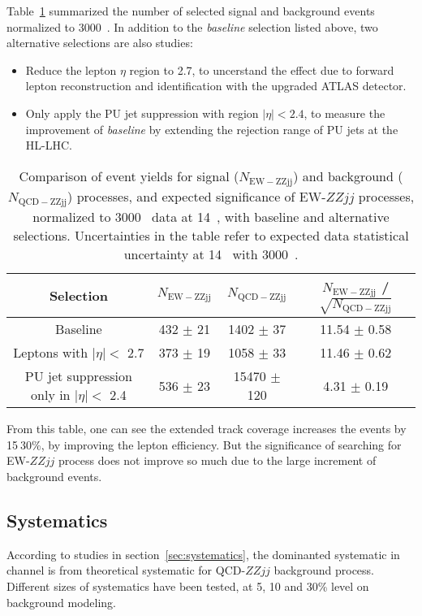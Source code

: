 Table~\ref{tab:event_yield} summarized the number of selected signal and background events normalized to 3000~\ifb.
In addition to the \textit{baseline} selection listed above, two alternative selections are also studies:
\begin{itemize}
	\item Reduce the lepton $\eta$ region to 2.7, to uncerstand the effect due to forward lepton reconstruction and identification with the upgraded ATLAS detector.
	\item Only apply the PU jet suppression with region $|\eta| < 2.4$, to measure the improvement of \textit{baseline} by extending the rejection range of PU jets at the HL-LHC.
\end{itemize}
\begin{table}[htbp]
  \small
  \centering
  \begin{tabular}{|c|c|c|c|}
    \hline
    Selection & $N_{\mathrm{EW-ZZjj}}$ & $N_{\mathrm{QCD-ZZjj}}$ & $N_{\mathrm{EW-ZZjj}}$ / $\sqrt{N_{\mathrm{QCD-ZZjj}}}$ \\
    \hline
    Baseline                                 & 432 $\pm$ 21 & 1402 $\pm$ 37   & 11.54 $\pm$ 0.58 \\
    \hline
    Leptons with $|\eta|<$ 2.7               & 373 $\pm$ 19 & 1058 $\pm$ 33   & 11.46 $\pm$ 0.62 \\
    \hline
    PU jet suppression only in $|\eta|<$ 2.4 & 536 $\pm$ 23 & 15470 $\pm$ 120 &  4.31 $\pm$ 0.19  \\
    \hline
  \end{tabular}
  \caption{
    Comparison of event yields for signal ($N_{\mathrm{EW-ZZjj}}$) and background ($N_{\mathrm{QCD-ZZjj}}$) processes, 
    and expected significance of EW-$ZZjj$ processes,
    normalized to 3000~\ifb{} data at 14~\TeV{},
    with baseline and alternative selections.
    Uncertainties in the table refer to expected data statistical uncertainty at 14~\TeV{} with 3000~\ifb{}.
  }
  \label{tab:event_yield}
\end{table}
From this table, one can see the extended track coverage increases the \lllljj events by 15$~$30\%, by improving the lepton efficiency.
But the significance of searching for EW-$ZZjj$ process does not improve so much due to the large increment of background events.


\subsection{Systematics}

According to studies in section~\ref{sec:systematics}, the dominanted systematic in \llll channel is from theoretical systematic for QCD-$ZZjj$ background process.
Different sizes of systematics have been tested, at 5, 10 and 30\% level on background modeling.

